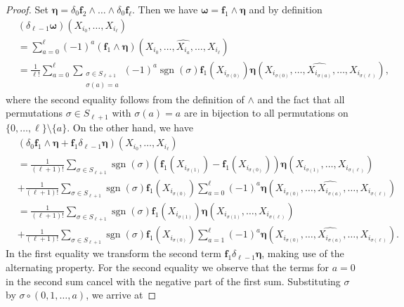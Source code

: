\documentclass[10pt]{article}
\theoremstyle{plain}
\theoremstyle{definition}
\theoremstyle{remark}
\begin{document}
    \begin{proof}
        Set $\boldsymbol{\eta}=\delta_0\mathbf{f}_2\wedge\dots\wedge \delta_0\mathbf{f}_\ell$. Then we have $\boldsymbol{\omega}=\mathbf{f}_1\wedge \boldsymbol{\eta}$ and by definition 
        \begin{align}\label{eq:lhs:derivative:form}
            &(\delta_{\ell-1}\boldsymbol{\omega})(X_{i_0},\dots,X_{i_\ell})\\
            &=\sum_{a=0}^{\ell}(-1)^a(\mathbf{f}_1\wedge \boldsymbol{\eta})(X_{i_0},\dots,\widehat{X_{i_a}},\dots,X_{i_{\ell}})\nonumber\\
            &=\frac{1}{\ell!}\sum_{a=0}^\ell\sum_{\substack{\sigma\in S_{\ell+1}\\ \sigma(a)=a}}(-1)^a \operatorname{sgn}(\sigma)\mathbf{f}_1(X_{i_{\sigma(0)}})\boldsymbol{\eta}(X_{i_{\sigma(0)}},\dots,\widehat{X_{i_{\sigma(a)}}},\dots,X_{i_{\sigma(\ell)}}),\nonumber
        \end{align}
        where the second equality follows from the definition of $\wedge$ and the fact that all permutations $\sigma\in S_{\ell+1}$ with $\sigma(a)=a$ are in bijection to all permutations on $\{0,\dots,\ell\}\setminus \{a\}$.  
        On the other hand, we have
        \begin{align*}
            &(\delta_0\mathbf{f}_1\wedge \boldsymbol{\eta}+\mathbf{f}_1\delta_{\ell-1}\boldsymbol{\eta})(X_{i_{0}},\dots, X_{i_{\ell}})\\
            &=\frac{1}{(\ell+1)!}\sum_{\sigma\in S_{\ell+1}}\operatorname{sgn}(\sigma)(\mathbf{f}_1(X_{i_{\sigma(1)}})-\mathbf{f}_1(X_{i_{\sigma(0)}}))\boldsymbol{\eta}(X_{i_{\sigma(1)}},\dots, X_{i_{\sigma(\ell)}})\\
            &+\frac{1}{(\ell+1)!}\sum_{\sigma\in S_{\ell+1}}\operatorname{sgn}(\sigma)\mathbf{f}_1(X_{i_{\sigma(0)}})\sum_{a=0}^{\ell}(-1)^a\boldsymbol{\eta}(X_{i_{\sigma(0)}},\dots,\widehat{X_{i_{\sigma(a)}}},\dots,X_{i_{\sigma(\ell)}})\\
            &=\frac{1}{(\ell+1)!}\sum_{\sigma\in S_{\ell+1}}\operatorname{sgn}(\sigma)\mathbf{f}_1(X_{i_{\sigma(1)}})\boldsymbol{\eta}(X_{i_{\sigma(1)}},\dots, X_{i_{\sigma(\ell)}})\\
            &+\frac{1}{(\ell+1)!}\sum_{\sigma\in S_{\ell+1}}\operatorname{sgn}(\sigma)\mathbf{f}_1(X_{i_{\sigma(0)}})\sum_{a=1}^{\ell}(-1)^a\boldsymbol{\eta}(X_{i_{\sigma(0)}},\dots,\widehat{X_{i_{\sigma(a)}}},\dots,X_{i_{\sigma(\ell)}}).
        \end{align*}
        In the first equality we transform the second term $\mathbf{f}_1\delta_{\ell-1}\boldsymbol{\eta}$, making use of the alternating property. For the second equality we observe that the terms for $a=0$ in the second sum cancel with the negative part of the first sum. Substituting $\sigma$ by $\sigma\circ (0,1,\dots,a)$, we arrive at

\end{proof}
\end{document}
